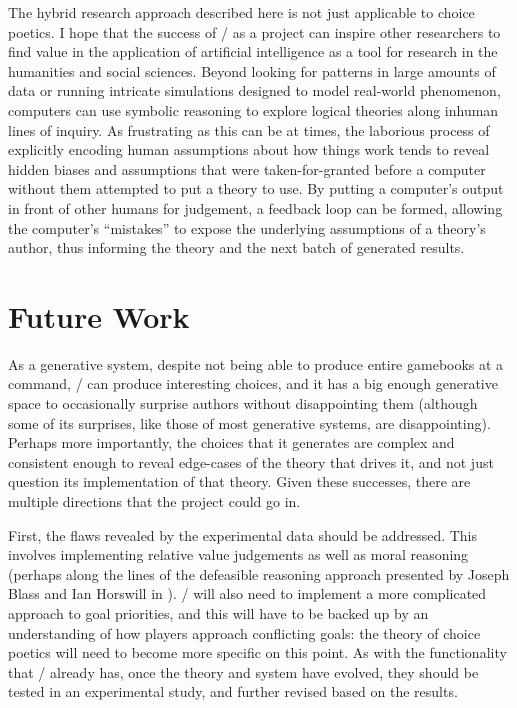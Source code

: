 The hybrid research approach described here is not just applicable to choice poetics.
%
I hope that the success of \dunyazad/ as a project can inspire other researchers to find value in the application of artificial intelligence as a tool for research in the humanities and social sciences.
%
Beyond looking for patterns in large amounts of data or running intricate simulations designed to model real-world phenomenon, computers can use symbolic reasoning to explore logical theories along inhuman lines of inquiry.
%
As frustrating as this can be at times, the laborious process of explicitly encoding human assumptions about how things work tends to reveal hidden biases and assumptions that were taken-for-granted before a computer without them attempted to put a theory to use.
%
By putting a computer's output in front of other humans for judgement, a feedback loop can be formed, allowing the computer's ``mistakes'' to expose the underlying assumptions of a theory's author, thus informing the theory and the next batch of generated results.


\section{Future Work}

As a generative system, despite not being able to produce entire gamebooks at a command, \dunyazad/ can produce interesting choices, and it has a big enough generative space to occasionally surprise authors without disappointing them (although some of its surprises, like those of most generative systems, are disappointing).
%
Perhaps more importantly, the choices that it generates are complex and consistent enough to reveal edge-cases of the theory that drives it, and not just question its implementation of that theory.
%
Given these successes, there are multiple directions that the project could go in.


First, the flaws revealed by the experimental data should be addressed.
%
This involves implementing relative value judgements as well as moral reasoning (perhaps along the lines of the defeasible reasoning approach presented by Joseph Blass and Ian Horswill in \citep{Blass2015}).
%
\dunyazad/ will also need to implement a more complicated approach to goal priorities, and this will have to be backed up by an understanding of how players approach conflicting goals: the theory of choice poetics will need to become more specific on this point.
%
As with the functionality that \dunyazad/ already has, once the theory and system have evolved, they should be tested in an experimental study, and further revised based on the results.


